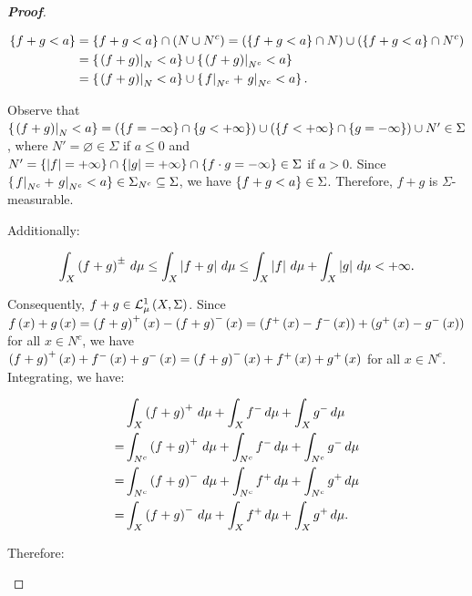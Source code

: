 \begin{proposition}
\begin{proof}[\rm\textbf{Proof}]
\begin{enumerate}
      \begin{equation}
        \begin{split}
          \left\{f+g<a\right\} & =\left\{f+g<a\right\}\cap\left(N\cup N^c\right)=\left(\left\{f+g<a\right\}\cap N\right)\cup\left(\left\{f+g<a\right\}\cap N^c\right)\\
          & =\left\{\left.\left(f+g\right)\right|_{N}<a\right\}\cup\left\{\left.\left(f+g\right)\right|_{N^c}<a\right\}\\
          &=\left\{\left.\left(f+g\right)\right|_{N}<a\right\}\cup\left\{\left.f\right|_{N^c}+\left.g\right|_{N^c}<a\right\}.
        \end{split}
      \end{equation}

      Observe that $\left\{\left.\left(f+g\right)\right|_{N}<a\right\}=\left(\left\{f=-\infty\right\}\cap\left\{g<+\infty\right\}\right)\cup\left(\left\{f<+\infty\right\}\cap\left\{g=-\infty\right\}\right)\cup N'\in\Sigma$, where $N'=\varnothing\in\Sigma$ if $a\leq 0$ and $N'=\left\{\left|f\right|=+\infty\right\}\cap\left\{\left|g\right|=+\infty\right\}\cap\left\{f\cdot g=-\infty\right\}\in\Sigma$ if $a>0$. Since $\left\{\left.f\right|_{N^c}+\left.g\right|_{N^c}<a\right\}\in\Sigma_{N^c}\subseteq\Sigma$, we have $\left\{f+g<a\right\}\in\Sigma$. Therefore, $f+g$ is $\Sigma$-measurable.

      Additionally:

      \begin{equation}
        \int_{X}{\left(f+g\right)^\pm\,d\mu}\leq\int_{X}{\left|f+g\right|\,d\mu}\leq\int_{X}{\left|f\right|\,d\mu}+\int_{X}{\left|g\right|\,d\mu}<+\infty.
      \end{equation}
      
      Consequently, $f+g\in\mathcal{L}^1_{\mu}\left(X,\Sigma\right)$. Since $f\left(x\right)+g\left(x\right)=\left(f+g\right)^+\left(x\right)-\left(f+g\right)^-\left(x\right)=\left(f^+\left(x\right)-f^-\left(x\right)\right)+\left(g^+\left(x\right)-g^-\left(x\right)\right)$ for all $x\in N^c$, we have $\left(f+g\right)^+\left(x\right)+f^-\left(x\right)+g^-\left(x\right)=\left(f+g\right)^-\left(x\right)+f^+\left(x\right)+g^+\left(x\right)$ for all $x\in N^c$. Integrating, we have:

      \begin{equation}
        \begin{split}
          & \int_{X}{\left(f+g\right)^+\,d\mu}+\int_{X}{f^-\,d\mu}+\int_{X}{g^-\,d\mu} \\
          = & \int_{N^c}{\left(f+g\right)^+\,d\mu}+\int_{N^c}{f^-\,d\mu}+\int_{N^c}{g^-\,d\mu}\\
          = & \int_{N^c}{\left(f+g\right)^-\,d\mu}+\int_{N^c}{f^+\,d\mu}+\int_{N^c}{g^+\,d\mu}\\
          = & \int_{X}{\left(f+g\right)^-\,d\mu}+\int_{X}{f^+\,d\mu}+\int_{X}{g^+\,d\mu}.
        \end{split}
      \end{equation}

      Therefore:


\end{enumerate}
\end{proof}
\end{proposition}
